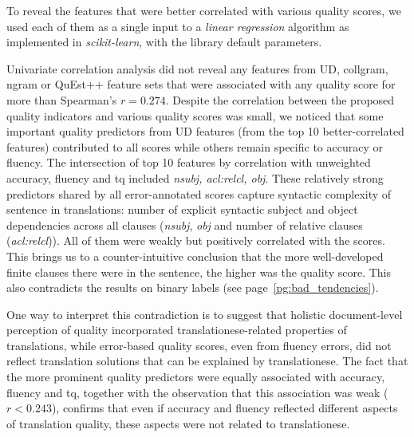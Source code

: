 To reveal the features that were better correlated with various quality scores, we used each of them as a single input to a \textit{linear regression} algorithm as implemented in \textit{scikit-learn}, with the library default parameters.  %

Univariate correlation analysis did not reveal any features from UD, collgram, ngram or QuEst++ feature sets that were associated with any quality score for more than Spearman's $r=0.274$. %
\label{pg:scores_not_translationese}
Despite the correlation between the proposed quality indicators and various quality scores was small, we noticed that some important quality predictors from UD features (from the top 10 better-correlated features) contributed to all scores while others remain specific to accuracy or fluency. The intersection of top 10 features by correlation with unweighted accuracy, fluency and tq included \textit{nsubj, acl:relcl, obj}. These relatively strong predictors shared by all error-annotated scores capture syntactic complexity of sentence in translations: number of explicit syntactic subject and object dependencies across all clauses (\textit{nsubj}, \textit{obj} and number of relative clauses (\textit{acl:relcl})). All of them were weakly but positively correlated with the scores. This brings us to a counter-intuitive conclusion that the more well-developed finite clauses there were in the sentence, the higher was the quality score. This also contradicts the results on binary labels (see page~\ref{pg:bad_tendencies}).

One way to interpret this contradiction is to suggest that holistic document-level perception of quality incorporated translationese-related properties of translations, while error-based quality scores, even from fluency errors, did not reflect translation solutions that can be explained by translationese. 
The fact that the more prominent quality predictors were equally associated with accuracy, fluency and tq, together with the observation that this association was weak ($r<0.243$), confirms that even if accuracy and fluency reflected different aspects of translation quality, these aspects were not related to translationese.


